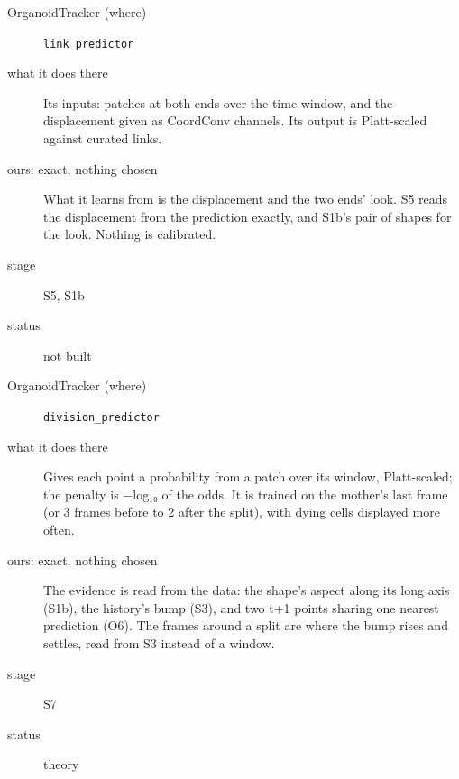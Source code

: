 \begin{description}
\item[{OrganoidTracker (where)}] \texttt{link\_\allowbreak{}predictor}
\item[{what it does there}] Its inputs: patches at both ends over the time window, and the displacement given as CoordConv channels. Its output is Platt-scaled against curated links.
\item[{ours: exact, nothing chosen}] What it learns from is the displacement and the two ends' look. S5 reads the displacement from the prediction exactly, and S1b's pair of shapes for the look. Nothing is calibrated.
\item[{stage}] S5, S1b
\item[{status}] not built
\end{description}

\begin{description}
\item[{OrganoidTracker (where)}] \texttt{division\_\allowbreak{}predictor}
\item[{what it does there}] Gives each point a probability from a patch over its window, Platt-scaled; the penalty is −log₁₀ of the odds. It is trained on the mother's last frame (or 3 frames before to 2 after the split), with dying cells displayed more often.
\item[{ours: exact, nothing chosen}] The evidence is read from the data: the shape's aspect along its long axis (S1b), the history's bump (S3), and two t+1 points sharing one nearest prediction (O6). The frames around a split are where the bump rises and settles, read from S3 instead of a window.
\item[{stage}] S7
\item[{status}] theory
\end{description}

